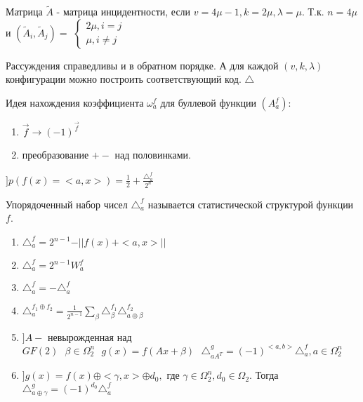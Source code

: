 Матрица $\tilde{A}$ - матрица инцидентности, если $v = 4\mu - 1, k = 2\mu, \lambda = \mu$.
Т.к. $n = 4\mu$ и $(\tilde{A}_i, \tilde{A}_j) = $
$\begin{cases}
	2\mu, i = j \\
	\mu, i\neq j
\end{cases}$

Рассуждения справедливы и в обратном порядке. А для каждой $(v, k, \lambda)$ конфигурации
можно построить соответствующий код. $\triangle $

Идея нахождения коэффициента $\omega_a^f$ для буллевой функции $(A_a^f)$:
\begin{enumerate}
	\item $\overrightarrow{f} \rightarrow (-1)^{\overrightarrow{f}}$
	\item преобразование $+-$ над половинками.
\end{enumerate}

$] p(f(x) = <a, x>) = \frac{1}{2} + \frac{\triangle_a^f}{2^n}$

\opr
Упорядоченный набор чисел $\triangle_a^f$ называется статистической структурой функции $f$.

\utv
\begin{enumerate}
	\item $\triangle_a^f = 2^{n - 1} - \vert\vert f(x) + <a, x> \vert\vert$
	\item $\triangle_a^f = 2^{n - 1} W_a^f$
	\item $\triangle_a^f = -\triangle_a^f$
	\item $\triangle_a^{f_1 \oplus f_2} = \frac{1}{2^{n - 1}} \sum_{\beta}\triangle_{\beta}^{f_1}\triangle_{a \oplus \beta}^{f_2}$
	\item $] A -$ невырожденная над $GF(2) \text{ } \beta \in \Omega_2^n \text{ } g(x) = f(Ax + \beta) \text{ } \triangle_{aA^T}^g = (-1)^{<a,b>}\triangle_a^f, a \in \Omega_2^n$
	\item $] g(x) = f(x) \oplus <\gamma, x> \oplus d_0, $ где $\gamma \in \Omega_2^n, d_0 \in \Omega_2$.
	Тогда $\triangle_{a\oplus\gamma}^g = (-1)^{d_0}\triangle_a^f$
\end{enumerate}